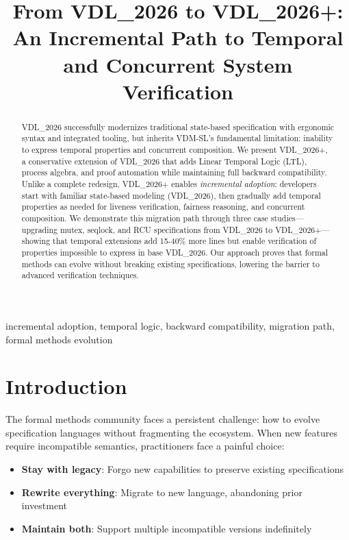 \documentclass[conference]{IEEEtran}
\begin{document}
\title{From VDL\_2026 to VDL\_2026+: An Incremental Path to Temporal and Concurrent System Verification}

\author{
}

\maketitle

\begin{abstract}
VDL\_2026 successfully modernizes traditional state-based specification with ergonomic syntax and integrated tooling, but inherits VDM-SL's fundamental limitation: inability to express temporal properties and concurrent composition. We present VDL\_2026+, a conservative extension of VDL\_2026 that adds Linear Temporal Logic (LTL), process algebra, and proof automation while maintaining full backward compatibility. Unlike a complete redesign, VDL\_2026+ enables \textit{incremental adoption}: developers start with familiar state-based modeling (VDL\_2026), then gradually add temporal properties as needed for liveness verification, fairness reasoning, and concurrent composition. We demonstrate this migration path through three case studies---upgrading mutex, seqlock, and RCU specifications from VDL\_2026 to VDL\_2026+---showing that temporal extensions add 15-40\% more lines but enable verification of properties impossible to express in base VDL\_2026. Our approach proves that formal methods can evolve without breaking existing specifications, lowering the barrier to advanced verification techniques.
\end{abstract}

\begin{IEEEkeywords}
incremental adoption, temporal logic, backward compatibility, migration path, formal methods evolution
\end{IEEEkeywords}

\section{Introduction}

The formal methods community faces a persistent challenge: how to evolve specification languages without fragmenting the ecosystem. When new features require incompatible semantics, practitioners face a painful choice:
\begin{itemize}
\item \textbf{Stay with legacy}: Forgo new capabilities to preserve existing specifications
\item \textbf{Rewrite everything}: Migrate to new language, abandoning prior investment
\item \textbf{Maintain both}: Support multiple incompatible versions indefinitely
\end{itemize}
\end{document}
